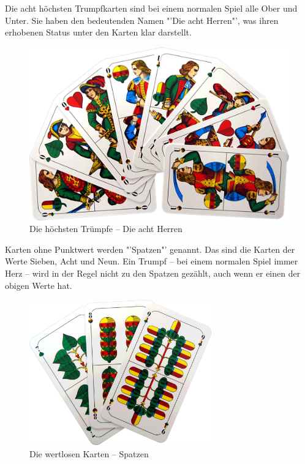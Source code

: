 \documentclass[
							a4paper, 
							11pt, 
							openany, 
							liststotoc,
							parskip=half, 
   							headings=normal
						]{scrreprt}
\begin{document}
{\clearpage

Die acht höchsten Trumpfkarten sind bei einem normalen Spiel alle Ober und Unter. Sie haben den bedeutenden Namen "'Die acht Herren"', was ihren erhobenen Status unter den Karten klar darstellt.

\begin{figure}[H]
\begin{center}
    \includegraphics[width=1.0\textwidth]{./pictures/cards/herren.jpg}
	\caption[Schafkopf -- Die Herren]{Die höchsten Trümpfe -- Die acht Herren} \label{fig:schafkopf_karten_herren}
\end{center}
\end{figure}

\clearpage

Karten ohne Punktwert werden "'Spatzen"' genannt. Das sind die Karten der Werte Sieben, Acht und Neun. Ein Trumpf -- bei einem normalen Spiel immer Herz -- wird in der Regel nicht zu den Spatzen gezählt, auch wenn er einen der obigen Werte hat.

\begin{figure}[H]
\begin{center}
    \includegraphics[width=0.7\textwidth]{./pictures/cards/spatzen.jpg}
	\caption[Schafkopf -- Die Spatzen]{Die wertlosen Karten -- Spatzen} \label{fig:schafkopf_karten_spatzen}
\end{center}
\end{figure}

}
\end{document}
